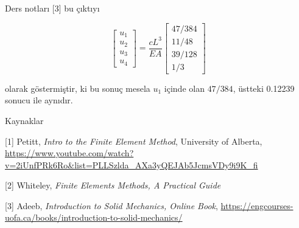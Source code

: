 \documentclass[12pt,fleqn]{article}\usepackage{../../common}
\begin{document}
Ders notları [3] bu çıktıyı

$$
\left[\begin{array}{c}
u_1 \\ u_2 \\ u_3 \\ u_4 
\end{array}\right] =
\frac{cL^3}{EA}
\left[\begin{array}{c}
47/384 \\ 11/48 \\ 39/128 \\ 1/3
\end{array}\right]
$$

olarak göstermiştir, ki bu sonuç mesela $u_1$ içinde olan $47/384$, üstteki
0.12239 sonucu ile aynıdır.

Kaynaklar

[1] Petitt, {\em Intro to the Finite Element Method}, University of Alberta,
    \url{https://www.youtube.com/watch?v=2iUnfPRk6Ro&list=PLLSzlda_AXa3yQEJAb5JcmsVDy9i9K_fi}

[2] Whiteley, {\em Finite Elements Methods, A Practical Guide}
    
[3] Adeeb, {\em Introduction to Solid Mechanics, Online Book},
    \url{https://engcourses-uofa.ca/books/introduction-to-solid-mechanics/}
\end{document}
